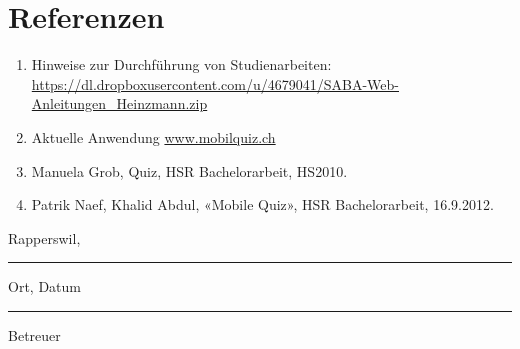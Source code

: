\section{Referenzen}
\begin{enumerate}
	  \item Hinweise zur Durchführung von Studienarbeiten: \url{https://dl.dropboxusercontent.com/u/4679041/SABA-Web-Anleitungen\_Heinzmann.zip}
	  \item Aktuelle Anwendung \url{www.mobilquiz.ch}  
	  \item Manuela Grob, Quiz, HSR Bachelorarbeit, HS2010.
	  \item Patrik Naef, Khalid Abdul, «Mobile Quiz», HSR Bachelorarbeit, 16.9.2012.
\end{enumerate}

\bigskip \bigskip
\parbox{6cm}{Rapperswil, \hrule
\strut \footnotesize Ort, Datum} \hfill
\parbox{5cm}{\hrule
\strut \footnotesize Betreuer}
